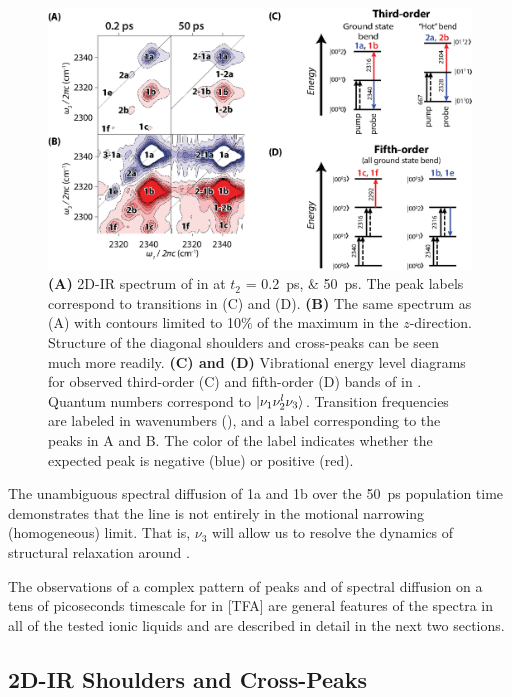 \documentclass[%
  class = book,%
  crop = false,%
  float = true,%
  multi = true,%
  preview = false,%
]{standalone}
\begin{document}
{\begin{figure}
  \centering
  \includegraphics[scale=1]{fig5_update4.eps}
  \caption[2D-IR spectra of \texorpdfstring{}{carbon dioxide} in ionic liquids]{\label{fig:example 2D}\textbf{(A)} 2D-IR spectrum of  in \ce{[Im_{4,1}][TFA]} at \(t_2\) = \SIlist[list-units = single]{0.2;50}{\ps}. The peak labels correspond to transitions in (C) and (D). \textbf{(B)} The same spectrum as (A) with contours limited to 10\% of the maximum in the \(z\)-direction. Structure of the diagonal shoulders and cross-peaks can be seen much more readily. \textbf{(C) and (D)} Vibrational energy level diagrams for observed third-order (C) and fifth-order (D) bands of  in \ce{[Im_{4,1}][TFA]}. Quantum numbers correspond to \(\ket{\nu_1 \nu_2^l \nu_3}\). Transition frequencies are labeled in wavenumbers (\si{\wavenumber}), and a label corresponding to the peaks in A and B. The color of the label indicates whether the expected peak is negative (blue) or positive (red).}
\end{figure}

The unambiguous spectral diffusion of 1a and 1b over the \SI{50}{\ps} population time demonstrates that the line is not entirely in the motional narrowing (homogeneous) limit. That is, \(\nu_3\) will allow us to resolve the dynamics of structural relaxation around .

The observations of a complex pattern of peaks and of spectral diffusion on a tens of picoseconds timescale for  in \ce{[Im_{4,1}]}[TFA]  are general features of the spectra in all of the tested ionic liquids and are described in detail in the next two sections.

\subsection{2D-IR Shoulders and Cross-Peaks}
\label{sec:shoulders}

}
\end{document}
